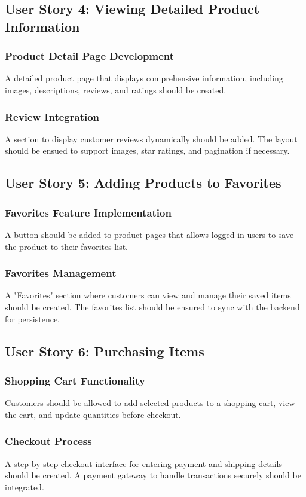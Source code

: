\documentclass[a4paper,journal]{IEEEtran}
\begin{document}
\subsection{User Story 4: Viewing Detailed Product Information}
\subsubsection{Product Detail Page Development}
A detailed product page that displays comprehensive information,
including images, descriptions, reviews, and ratings should be created.
\subsubsection{Review Integration}
A section to display customer reviews dynamically should be added.
The layout should be ensued to support images, star ratings,
and pagination if necessary.

\subsection{User Story 5: Adding Products to Favorites}
\subsubsection{Favorites Feature Implementation}
A button should be added to product pages that allows logged-in users to save
the product to their favorites list.
\subsubsection{Favorites Management}
A "Favorites" section where customers can view and manage their saved
items should be created.
The favorites list should be ensured to sync with the backend for persistence.

\subsection{User Story 6: Purchasing Items}
\subsubsection{Shopping Cart Functionality}
Customers should be allowed to add selected products to a shopping cart,
view the cart, and update quantities before checkout.
\subsubsection{Checkout Process}
A step-by-step checkout interface for entering payment and shipping
details should be created.
A payment gateway to handle transactions securely should be integrated.
\end{document}
